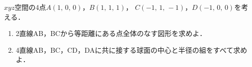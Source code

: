 \documentclass[../../main.tex]{subfiles}
\begin{document}
$xyz$空間の4点$A(1, \, 0, \, 0)$，$B(1, \, 1, \, 1)$，
$C(-1, \, 1, \, -1)$，$D(-1, \, 0, \, 0)$を考える．
\begin{enumerate}
  \item2直線AB，BCから等距離にある点全体のなす図形を求めよ．
  \item4直線AB，BC，CD，DAに共に接する球面の中心と半径の組をすべて求めよ．
\end{enumerate}
\end{document}

